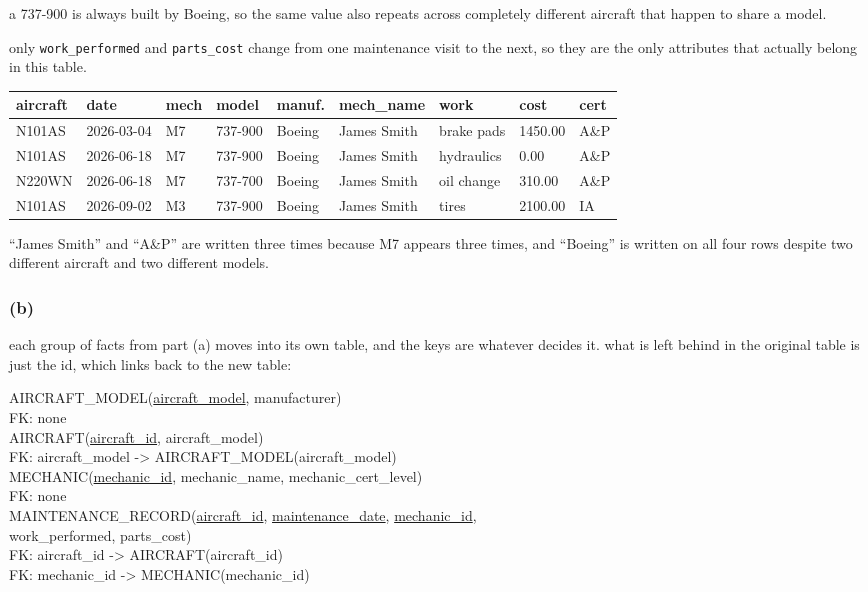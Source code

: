 \documentclass[12pt]{article}
\newcommand{\schema}[1]{%
  \begin{center}%
  \setlength{\fboxsep}{8pt}%
  \colorbox{gray!10}{%
    \begin{minipage}{0.93\linewidth}\ttfamily\small\raggedright #1\end{minipage}}%
  \end{center}%
}
\begin{document}
a 737-900 is always built by Boeing, so the same value also repeats across
completely different aircraft that happen to share a model.

only \texttt{work\_performed} and \texttt{parts\_cost} change from one
maintenance visit to the next, so they are the only attributes that actually
belong in this table.

\begin{table}[H]
\centering
\footnotesize
\begin{tabular}{|l|l|l|l|l|l|l|l|l|}
\hline
\textbf{aircraft} & \textbf{date} & \textbf{mech} & \textbf{model} &
\textbf{manuf.} & \textbf{mech\_name} & \textbf{work} & \textbf{cost} &
\textbf{cert} \\
\hline
N101AS & 2026-03-04 & M7 & 737-900 & Boeing & James Smith & brake pads & 1450.00 & A\&P \\
N101AS & 2026-06-18 & M7 & 737-900 & Boeing & James Smith & hydraulics & 0.00 & A\&P \\
N220WN & 2026-06-18 & M7 & 737-700 & Boeing & James Smith & oil change & 310.00 & A\&P \\
N101AS & 2026-09-02 & M3 & 737-900 & Boeing & James Smith & tires & 2100.00 & IA \\
\hline
\end{tabular}
\end{table}

``James Smith'' and ``A\&P'' are written three times because M7 appears three
times, and ``Boeing'' is written on all four rows despite two different
aircraft and two different models.

\newpage

\subsubsection*{(b)}

each group of facts from part (a) moves into its own table, and the keys are whatever
decides it. what is left behind in the original table is just the id, which
links back to the new table:

\schema{
AIRCRAFT\_MODEL(\underline{aircraft\_model}, manufacturer)\\
FK: none\\[8pt]
AIRCRAFT(\underline{aircraft\_id}, aircraft\_model)\\
FK: aircraft\_model -> AIRCRAFT\_MODEL(aircraft\_model)\\[8pt]
MECHANIC(\underline{mechanic\_id}, mechanic\_name, mechanic\_cert\_level)\\
FK: none\\[8pt]
MAINTENANCE\_RECORD(\underline{aircraft\_id}, \underline{maintenance\_date},
\underline{mechanic\_id},\\
\hspace*{2em}work\_performed, parts\_cost)\\
FK: aircraft\_id -> AIRCRAFT(aircraft\_id)\\
FK: mechanic\_id -> MECHANIC(mechanic\_id)
}
\end{document}
